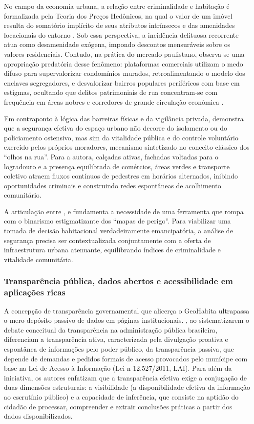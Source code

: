 \documentclass[
    12pt,
    oneside,            %
    a4paper,
    brazilian
    ]{abntex2}
\begin{document}
No campo da economia urbana, a relação entre criminalidade e habitação é formalizada pela Teoria dos Preços Hedônicos, na qual o valor de um imóvel resulta do somatório implícito de seus atributos intrínsecos e das amenidades locacionais do entorno \cite{teixeira2016}. Sob essa perspectiva, a incidência delituosa recorrente atua como desamenidade exógena, impondo descontos mensuráveis sobre os valores residenciais. Contudo, na prática do mercado paulistano, observa-se uma apropriação predatória desse fenômeno: plataformas comerciais utilizam o medo difuso para supervalorizar condomínios murados, retroalimentando o modelo dos enclaves segregadores, e desvalorizar bairros populares periféricos com base em estigmas, ocultando que delitos patrimoniais de rua concentram-se com frequência em áreas nobres e corredores de grande circulação econômica \cite{nev2024}.


Em contraponto à lógica das barreiras físicas e da vigilância privada,  demonstra que a segurança efetiva do espaço urbano não decorre do isolamento ou do policiamento ostensivo, mas sim da vitalidade pública e do controle voluntário exercido pelos próprios moradores, mecanismo sintetizado no conceito clássico dos ``olhos na rua''. Para a autora, calçadas ativas, fachadas voltadas para o logradouro e a presença equilibrada de comércios, áreas verdes e transporte coletivo atraem fluxos contínuos de pedestres em horários alternados, inibindo oportunidades criminais e construindo redes espontâneas de acolhimento comunitário.

A articulação entre ,  e  fundamenta a necessidade de uma ferramenta que rompa com o binarismo estigmatizante dos ``mapas de perigo''. Para viabilizar uma tomada de decisão habitacional verdadeiramente emancipatória, a análise de segurança precisa ser contextualizada conjuntamente com a oferta de infraestrutura urbana atenuante, equilibrando índices de criminalidade e vitalidade comunitária.

\subsubsection{Transparência pública, dados abertos e acessibilidade em aplicações ricas}
A concepção de transparência governamental que alicerça o GeoHabita ultrapassa o mero depósito passivo de dados em páginas institucionais. , ao sistematizarem o debate conceitual da transparência na administração pública brasileira, diferenciam a transparência ativa, caracterizada pela divulgação proativa e espontânea de informações pelo poder público, da transparência passiva, que depende de demandas e pedidos formais de acesso provocados pelo munícipe com base na Lei de Acesso à Informação (Lei n\textordmasculine{} 12.527/2011, LAI). Para além da iniciativa, os autores enfatizam que a transparência efetiva exige a conjugação de duas dimensões estruturais: a visibilidade (a disponibilidade efetiva da informação ao escrutínio público) e a capacidade de inferência, que consiste na aptidão do cidadão de processar, compreender e extrair conclusões práticas a partir dos dados disponibilizados.
\end{document}
